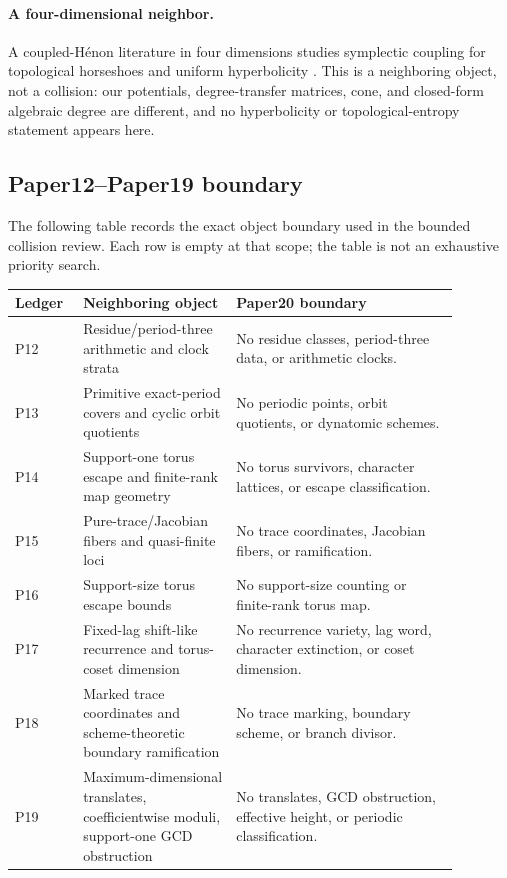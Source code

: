 \documentclass[11pt]{article}
\theoremstyle{remark}
\numberwithin{equation}{section}
\begin{document}
\paragraph{A four-dimensional neighbor.}
A coupled-Hénon literature in four dimensions studies symplectic coupling for
topological horseshoes and uniform hyperbolicity
\citep{Fujioka2023}.  This is a neighboring object, not a collision: our
potentials, degree-transfer matrices, cone, and closed-form algebraic degree
are different, and no hyperbolicity or topological-entropy statement appears
here.

\subsection{Paper12--Paper19 boundary}

The following table records the exact object boundary used in the bounded
collision review.  Each row is empty at that scope; the table is not an
exhaustive priority search.

\begin{center}
\small
\begin{tabular}{p{0.12\linewidth}p{0.31\linewidth}p{0.45\linewidth}}
\toprule
Ledger & Neighboring object & Paper20 boundary \\
\midrule
P12 & Residue/period-three arithmetic and clock strata
 & No residue classes, period-three data, or arithmetic clocks.\\
P13 & Primitive exact-period covers and cyclic orbit quotients
 & No periodic points, orbit quotients, or dynatomic schemes.\\
P14 & Support-one torus escape and finite-rank map geometry
 & No torus survivors, character lattices, or escape classification.\\
P15 & Pure-trace/Jacobian fibers and quasi-finite loci
 & No trace coordinates, Jacobian fibers, or ramification.\\
P16 & Support-size torus escape bounds
 & No support-size counting or finite-rank torus map.\\
P17 & Fixed-lag shift-like recurrence and torus-coset dimension
 & No recurrence variety, lag word, character extinction, or coset dimension.\\
P18 & Marked trace coordinates and scheme-theoretic boundary ramification
 & No trace marking, boundary scheme, or branch divisor.\\
P19 & Maximum-dimensional translates, coefficientwise moduli, support-one GCD obstruction
 & No translates, GCD obstruction, effective height, or periodic classification.\\
\bottomrule
\end{tabular}
\end{center}
\end{document}
